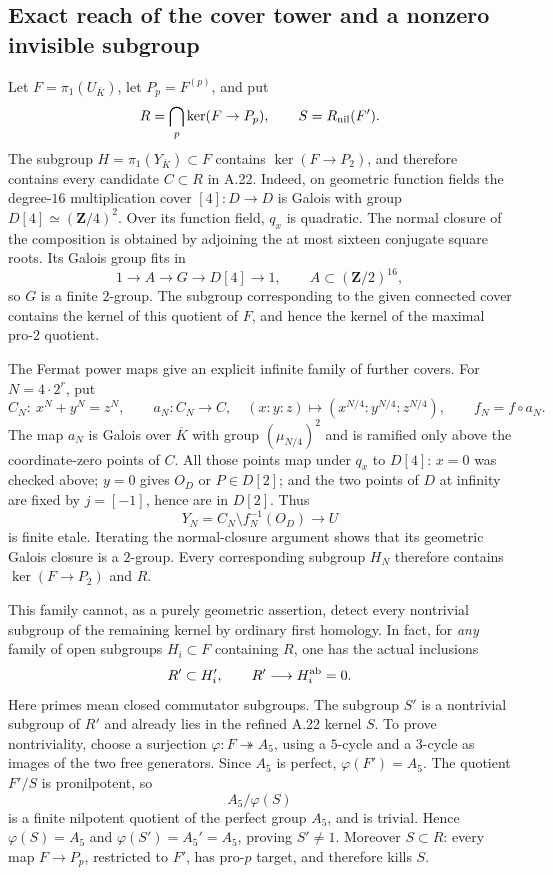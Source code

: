 \subsection*{Exact reach of the cover tower and a nonzero invisible subgroup}
Let $F=\pi_1(U_{\overline K})$, let $P_p=F^{(p)}$, and put
\[
 R=\bigcap_p\ker(F\to P_p),\qquad S=R_{\rm nil}(F').
\]
The subgroup $H=\pi_1(Y_{\overline K})\subset F$ contains $\ker(F\to P_2)$, and therefore contains every candidate $C\subset R$ in A.22. Indeed, on geometric function fields the degree-$16$ multiplication cover $[4]:D\to D$ is Galois with group $D[4]\simeq(\mathbf Z/4)^2$. Over its function field, $q_x$ is quadratic. The normal closure of the composition is obtained by adjoining the at most sixteen conjugate square roots. Its Galois group fits in
\[
 1\longrightarrow A\longrightarrow G\longrightarrow D[4]\longrightarrow1,
 \qquad A\subset(\mathbf Z/2)^{16},
\]
so $G$ is a finite $2$-group. The subgroup corresponding to the given connected cover contains the kernel of this quotient of $F$, and hence the kernel of the maximal pro-$2$ quotient.

The Fermat power maps give an explicit infinite family of further covers. For $N=4\cdot2^r$, put
\[
 C_N:\ x^N+y^N=z^N,\qquad
 a_N:C_N\to C,\quad(x:y:z)\mapsto(x^{N/4}:y^{N/4}:z^{N/4}),
 \qquad f_N=f\circ a_N.
\]
The map $a_N$ is Galois over $\overline K$ with group $(\mu_{N/4})^2$ and is ramified only above the coordinate-zero points of $C$. All those points map under $q_x$ to $D[4]$: $x=0$ was checked above; $y=0$ gives $O_D$ or $P\in D[2]$; and the two points of $D$ at infinity are fixed by $j=[-1]$, hence are in $D[2]$. Thus
\[
 Y_N=C_N\setminus f_N^{-1}(O_D)\longrightarrow U
\]
is finite etale. Iterating the normal-closure argument shows that its geometric Galois closure is a $2$-group. Every corresponding subgroup $H_N$ therefore contains $\ker(F\to P_2)$ and $R$.

This family cannot, as a purely geometric assertion, detect every nontrivial subgroup of the remaining kernel by ordinary first homology. In fact, for \emph{any} family of open subgroups $H_i\subset F$ containing $R$, one has the actual inclusions
\[
 R'\subset H_i',\qquad R'\longrightarrow H_i^{\rm ab}=0.
\]
Here primes mean closed commutator subgroups. The subgroup $S'$ is a nontrivial subgroup of $R'$ and already lies in the refined A.22 kernel $S$. To prove nontriviality, choose a surjection $\varphi:F\twoheadrightarrow A_5$, using a $5$-cycle and a $3$-cycle as images of the two free generators. Since $A_5$ is perfect, $\varphi(F')=A_5$. The quotient $F'/S$ is pronilpotent, so
\[
 A_5/\varphi(S)
\]
is a finite nilpotent quotient of the perfect group $A_5$, and is trivial. Hence $\varphi(S)=A_5$ and $\varphi(S')=A_5' = A_5$, proving $S'\ne1$. Moreover $S\subset R$: every map $F\to P_p$, restricted to $F'$, has pro-$p$ target, and therefore kills $S$.

